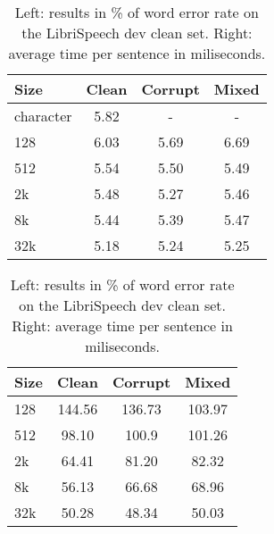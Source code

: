 \begin{table}[h]
\begin{minipage}[h]{.50\textwidth}
   \centering
	\begin{tabular}{l|ccc}
		\bf Size & \bf Clean & \bf Corrupt & \bf Mixed \\
		\hline
            character &  5.82  &  -  &  -  \\
            128 &  6.03  &  5.69  &  6.69  \\
            512 &    5.54  &  5.50   &  5.49 \\
            2k &  5.48  & 5.27  & 5.46  \\
            8k &  5.44  &   5.39 & 5.47  \\
            32k &  5.18  & 5.24  &  5.25 \\
	\end{tabular}
\end{minipage}
\begin{minipage}[h]{.49\textwidth}
   \centering
	\begin{tabular}{l|ccc}
		\bf Size & \bf Clean & \bf Corrupt & \bf Mixed \\
		\hline
			128 &  144.56  & 136.73  &  103.97 \\
            512 &  98.10  & 100.9   &   101.26 \\
            2k &  64.41  & 81.20  & 82.32  \\
            8k &  56.13  & 66.68  &  68.96 \\
            32k &  50.28  &  48.34 & 50.03  \\
	\end{tabular}
\end{minipage}
	\caption{Left: results in \% of word error rate on the LibriSpeech dev clean set. Right: average time per sentence in miliseconds.}
	\label{tab:results_vocabularies}
\end{table}

